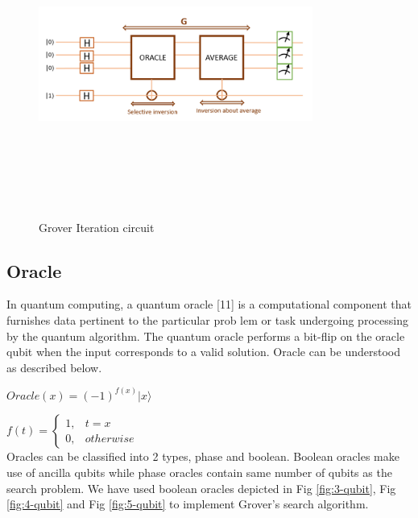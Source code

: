 \documentclass[conference]{IEEEtran}
\begin{document}
\begin{figure}[htbp]
	\centerline{\includegraphics[width=9cm,height=10cm,keepaspectratio]{fig4.png}}
	\caption{Grover Iteration circuit}
	\label{fig4}
\end{figure}

\subsection{Oracle}
In
quantum computing, a quantum oracle [11] is a computational
component that furnishes data pertinent to the particular prob
lem or task undergoing processing by the quantum algorithm.
The quantum oracle performs a bit-flip on the oracle qubit when the input corresponds to a valid solution. Oracle can be understood as described below.

$ Oracle(x) = (-1)^{f(x)} |x \rangle $

$ f(t) = \begin{cases}
		1, & t = x     \\
		0, & otherwise
	\end{cases} $
\\
Oracles can be classified into 2 types, phase and boolean. Boolean oracles make use of ancilla qubits while phase oracles contain same number of qubits as the search problem. We have used boolean oracles depicted in Fig \ref{fig:3-qubit}, Fig \ref{fig:4-qubit} and Fig \ref{fig:5-qubit} to implement Grover's search algorithm.
\end{document}
